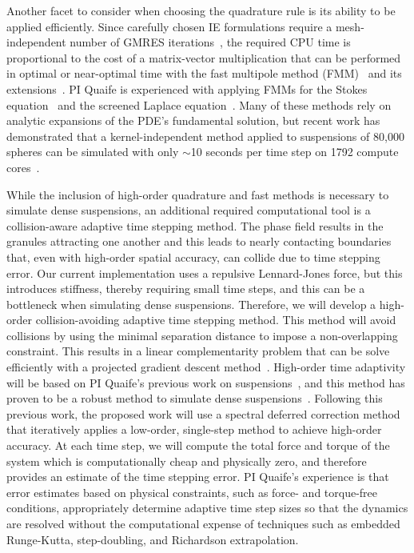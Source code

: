 Another facet to consider when choosing the quadrature rule is its
ability to be applied efficiently. Since carefully chosen IE
formulations require a mesh-independent number of GMRES
iterations~\cite{cam-ips-kel-mey-xue1996}, the required CPU time is
proportional to the cost of a matrix-vector multiplication that can be
performed in optimal or near-optimal time with the fast multipole method
(FMM)~\cite{fmm5} and its extensions~\cite{fmm1, fmm2, fmm3, fmm4, fmm6,
fmm7, ros-ols2016}. PI Quaife is experienced with applying FMMs for the
Stokes equation~\cite{qua-bir2014, bys-sha-qua2020} and the screened
Laplace equation~\cite{kro-qua2011, qua2011}. Many of these methods rely
on analytic expansions of the PDE's fundamental solution, but recent
work has demonstrated that a kernel-independent method applied to
suspensions of 80,000 spheres can be simulated with only $\sim$10
seconds per time step on 1792 compute cores~\cite{Yan2019}.

While the inclusion of high-order quadrature and fast methods is
necessary to simulate dense suspensions, an additional required
computational tool is a collision-aware adaptive time stepping method.
The phase field results in the granules attracting one another and this
leads to nearly contacting boundaries that, even with high-order spatial
accuracy, can collide due to time stepping error. Our current
implementation uses a repulsive Lennard-Jones force, but this introduces
stiffness, thereby requiring small time steps, and this can be a
bottleneck when simulating
dense suspensions. Therefore, we will develop a high-order
collision-avoiding adaptive time stepping method. This method will avoid
collisions by using the minimal separation distance to impose a
non-overlapping constraint. This results in a linear complementarity
problem that can be solve efficiently with a projected gradient descent
method~\cite{Yan2019}. High-order time adaptivity will be based on PI
Quaife's previous work on suspensions~\cite{qua-bir2016}, and this
method has proven to be a robust method to simulate dense
suspensions~\cite{qua-vee-you2019, kab-qua-bir2017, qua-gan-you2021}.
Following this previous work, the proposed work will use a spectral
deferred correction method that iteratively applies a low-order,
single-step method to achieve high-order accuracy. At each time step, we
will compute the total force and torque of the system which is
computationally cheap and physically zero, and therefore provides an
estimate of the time stepping error. PI Quaife's experience is that
error estimates based on physical constraints, such as force- and
torque-free conditions, appropriately determine adaptive time step sizes
so that the dynamics are resolved without the computational expense of
techniques such as embedded Runge-Kutta, step-doubling, and Richardson
extrapolation.

